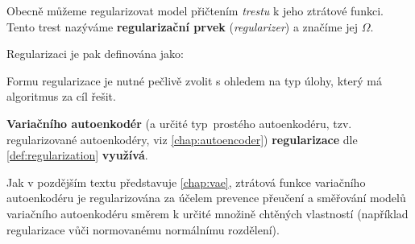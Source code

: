 Obecně můžeme regularizovat model přičtením \emph{trestu} k jeho ztrátové funkci. Tento trest nazýváme \textbf{regularizační prvek} (\emph{regularizer}) a značíme jej $\Omega$.

Regularizaci je pak definována jako:
\begin{definition}[Regularizace]
    \label{def:regularization}
     \cite{Goodfellow2016}
\end{definition}

Formu regularizace je nutné pečlivě zvolit s ohledem na typ úlohy, který má algoritmus za cíl řešit.

\textbf{Variačního autoenkodér} (a určité typ\ prostého autoenkodéru, tzv. regularizované autoenkodéry, viz \autoref{chap:autoencoder}) \textbf{regularizace} dle \autoref{def:regularization} \textbf{využívá}.

Jak v pozdějším textu představuje \autoref{chap:vae}, ztrátová funkce variačního autoenkodéru je regularizována za účelem prevence přeučení a směřování modelů variačního autoenkodéru směrem k určité množině chtěných vlastností (například regularizace vůči normovanému normálnímu rozdělení). \cite{Kingma2014}







